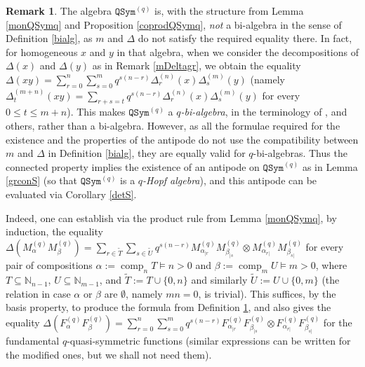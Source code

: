 \documentclass{article}
\theoremstyle{definition}
\newtheorem{rmk}[thm]{Remark}
\begin{document}
\begin{rmk}
The algebra $\mathtt{QSym}^{(q)}$ is, with the structure from Lemma \ref{monQSymq} and Proposition \ref{coprodQSymq}, \emph{not} a bi-algebra in the sense of Definition \ref{bialg}, as $m$ and $\Delta$ do not satisfy the required equality there. In fact, for homogeneous $x$ and $y$ in that algebra, when we consider the decompositions of $\Delta(x)$ and $\Delta(y)$ as in Remark \ref{mDeltagr}, we obtain the equality $\Delta(xy)=\sum_{r=0}^{n}\sum_{s=0}^{m}q^{s(n-r)}\Delta_{r}^{(n)}(x)\Delta_{s}^{(m)}(y)$ (namely $\Delta_{t}^{(m+n)}(xy)=\sum_{r+s=t}q^{s(n-r)}\Delta_{r}^{(n)}(x)\Delta_{s}^{(m)}(y)$ for every $0 \leq t \leq m+n$). This makes $\mathtt{QSym}^{(q)}$ a \emph{$q$-bi-algebra}, in the terminology of \cite{[EK]}, \cite{[L]} and others, rather than a bi-algebra. However, as all the formulae required for the existence and the properties of the antipode do not use the compatibility between $m$ and $\Delta$ in Definition \ref{bialg}, they are equally valid for $q$-bi-algebras. Thus the connected property implies the existence of an antipode on $\mathtt{QSym}^{(q)}$ as in Lemma \ref{grconS} (so that $\mathtt{QSym}^{(q)}$ is a \emph{$q$-Hopf algebra}), and this antipode can be evaluated via Corollary \ref{detS}. \label{qHopf}
\end{rmk}
Indeed, one can establish via the product rule from Lemma \ref{monQSymq}, by induction, the equality $\Delta(M_{\alpha}^{(q)}M_{\beta}^{(q)})=\sum_{r\in\tilde{T}}\sum_{s\in\tilde{U}}q^{s(n-r)}M_{\alpha_{|r}}^{(q)}M_{\beta_{|s}}^{(q)} \otimes M_{\alpha_{r|}}^{(q)}M_{\beta_{s|}}^{(q)}$ for every pair of compositions $\alpha:=\operatorname{comp}_{n}T \vDash n>0$ and $\beta:=\operatorname{comp}_{m}U \vDash m>0$, where $T\subseteq\mathbb{N}_{n-1}$, $U\subseteq\mathbb{N}_{m-1}$, and $\tilde{T}:=T\cup\{0,n\}$ and similarly $\tilde{U}:=U\cup\{0,m\}$ (the relation in case $\alpha$ or $\beta$ are $\emptyset$, namely $mn=0$, is trivial). This suffices, by the basis property, to produce the formula from Definition \ref{qHopf}, and also gives the equality $\Delta(F_{\alpha}^{(q)}F_{\beta}^{(q)})=\sum_{r=0}^{n}\sum_{s=0}^{m}q^{s(n-r)}F_{\alpha_{|r}}^{(q)}F_{\beta_{|s}}^{(q)} \otimes F_{\alpha_{r|}}^{(q)}F_{\beta_{s|}}^{(q)}$ for the fundamental $q$-quasi-symmetric functions (similar expressions can be written for the modified ones, but we shall not need them).
\end{document}
